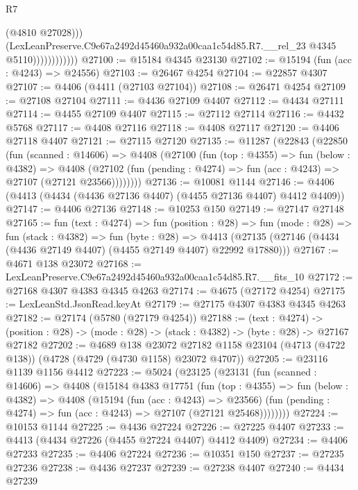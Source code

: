 \begin{lexlean}{R7}
\begin{coremodule}
                              (@4810 @27028)))
                          (LexLeanPreserve.C9e67a2492d45460a932a00caa1c54d85.R7.__rel_23
                            @4345
                            @5110))))))))))))
@27100 := @15184 @4345 @23130
@27102 := @15194 (fun (acc : @4243) => @24556)
@27103 := @26467 @4254
@27104 := @22857 @4307
@27107 := @4406 (@4411 (@27103 @27104))
@27108 := @26471 @4254
@27109 := @27108 @27104
@27111 := @4436 @27109 @4407
@27112 := @4434 @27111
@27114 := @4455 @27109 @4407
@27115 := @27112 @27114
@27116 := @4432 @5768
@27117 := @4408 @27116
@27118 := @4408 @27117
@27120 := @4406 @27118 @4407
@27121 := @27115 @27120
@27135 := @11287
    (@22843
      (@22850
        (fun (scanned : @14606) =>
        @4408
          (@27100
            (fun (top : @4355) =>
            fun (below : @4382) =>
            @4408
              (@27102 (fun (pending : @4274) => fun (acc : @4243) => @27107 (@27121 @23566))))))))
@27136 := @10081 @1144
@27146 := @4406 (@4413 (@4434 (@4436 @27136 @4407) (@4455 @27136 @4407) @4412 @4409))
@27147 := @4406 @27136
@27148 := @10253 @150
@27149 := @27147 @27148
@27165 := fun (text : @4274) =>
  fun (position : @28) =>
  fun (mode : @28) =>
  fun (stack : @4382) =>
  fun (byte : @28) =>
  @4413 (@27135 (@27146 (@4434 (@4436 @27149 @4407) (@4455 @27149 @4407) @22992 @17880)))
@27167 := @4671 @138 @23072
@27168 := LexLeanPreserve.C9e67a2492d45460a932a00caa1c54d85.R7.__fits_10
@27172 := @27168 @4307 @4383 @4345 @4263
@27174 := @4675 (@27172 @4254)
@27175 := LexLeanStd.JsonRead.keyAt
@27179 := @27175 @4307 @4383 @4345 @4263
@27182 := @27174 (@5780 (@27179 @4254))
@27188 := (text : @4274) ->
  (position : @28) -> (mode : @28) -> (stack : @4382) -> (byte : @28) -> @27167 @27182
@27202 := @4689
    @138
    @23072
    @27182
    @1158
    @23104
    (@4713 (@4722 @138))
    (@4728 (@4729 (@4730 @1158) @23072 @4707))
@27205 := @23116 @1139 @1156 @4412
@27223 := @5024
    (@23125
      (@23131
        (fun (scanned : @14606) =>
        @4408
          (@15184
            @4383
            @17751
            (fun (top : @4355) =>
            fun (below : @4382) =>
            @4408
              (@15194
                (fun (acc : @4243) => @23566)
                (fun (pending : @4274) => fun (acc : @4243) => @27107 (@27121 @25468))))))))
@27224 := @10153 @1144
@27225 := @4436 @27224
@27226 := @27225 @4407
@27233 := @4413 (@4434 @27226 (@4455 @27224 @4407) @4412 @4409)
@27234 := @4406 @27233
@27235 := @4406 @27224
@27236 := @10351 @150
@27237 := @27235 @27236
@27238 := @4436 @27237
@27239 := @27238 @4407
@27240 := @4434 @27239

\end{coremodule}
\end{lexlean}
